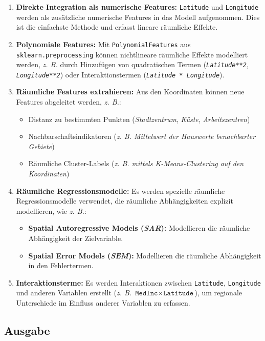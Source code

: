\begin{enumerate}
    \item \textbf{Direkte Integration als numerische Features:} \texttt{Latitude} und \texttt{Longitude} werden als zusätzliche numerische Features in das Modell aufgenommen. Dies ist die einfachste Methode und erfasst lineare räumliche Effekte.
    \item \textbf{Polynomiale Features:} Mit \lstinline{PolynomialFeatures} aus \lstinline{sklearn.preprocessing} können nichtlineare räumliche Effekte modelliert werden, \textit{\acs{z. B.}} durch Hinzufügen von quadratischen Termen (\textit{\lstinline{Latitude**2}, \lstinline{Longitude**2}}) oder Interaktionstermen (\textit{\lstinline{Latitude * Longitude}}).
    \item \textbf{Räumliche Features extrahieren:} Aus den Koordinaten können neue Features abgeleitet werden, \textit{\acs{z. B.}}:
    \begin{itemize}
        \item Distanz zu bestimmten Punkten (\textit{Stadtzentrum}, \textit{Küste}, \textit{Arbeitszentren})
        \item Nachbarschaftsindikatoren (\textit{\acs{z. B.} Mittelwert der Hauswerte benachbarter Gebiete})
        \item Räumliche Cluster-Labels (\textit{\acs{z. B.} mittels K-Means-Clustering auf den Koordinaten})
    \end{itemize}
    \item \textbf{Räumliche Regressionsmodelle:} Es werden spezielle räumliche Regressionsmodelle verwendet, die räumliche Abhängigkeiten explizit modellieren, wie \textit{\acs{z. B.}}:
    \begin{itemize}
        \item \textbf{Spatial Autoregressive Models (\textit{\acs{SAR}}):} Modellieren die räumliche Abhängigkeit der Zielvariable.
        \item \textbf{Spatial Error Models (\textit{\acs{SEM}}):} Modellieren die räumliche Abhängigkeit in den Fehlertermen.
    \end{itemize}
    \item \textbf{Interaktionsterme:} Es werden Interaktionen zwischen \texttt{Latitude}, \texttt{Longitude} und anderen Variablen erstellt (\textit{\acs{z. B.}} $\texttt{MedInc} \times \texttt{Latitude}$), um regionale Unterschiede im Einfluss anderer Variablen zu erfassen.
\end{enumerate}

\subsection{Ausgabe}


